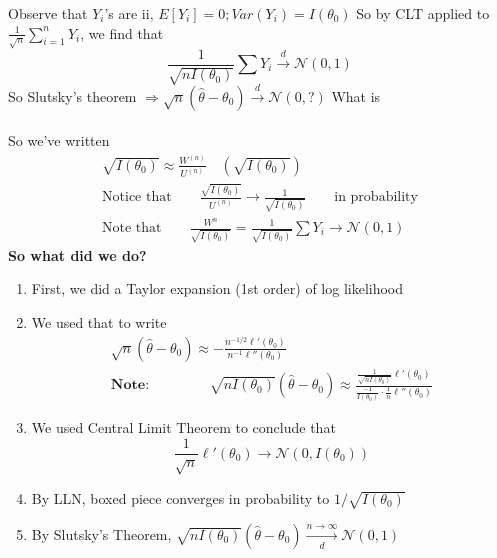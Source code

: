 Observe that $Y_i$'s are ii, $E[Y_i] = 0; Var(Y_i) = I(\theta_0)$ So by CLT applied to $\frac{1}{\sqrt{n}} \sum\limits_{i=1}^n Y_i$, we find that
\begin{equation*}
	\frac{1}{\sqrt{n I(\theta_0)}} \sum Y_i \xrightarrow{d} \mathcal{N}(0,1)
\end{equation*}
So Slutsky's theorem $\Rightarrow \sqrt{n} (\hat{\theta} - \theta_0) \xrightarrow{d} \mathcal{N} (0, ?)$ \qquad What is \\\\
So we've written 
\begin{gather*}
	[\sqrt{n} (\hat{\theta} - \theta_0) ] \sqrt{I(\theta_0)} \approx \frac{W^{(n)}}{U^{(n)}} \quad (\sqrt{I(\theta_0)})\\
	\text{Notice that} \qquad \frac{\sqrt{I(\theta_0)}}{U^{(n)}} \rightarrow \frac{1}{\sqrt{I(\theta_0)}} \qquad \text{in probability}\\
	\text{Note that} \qquad \frac{W^n}{\sqrt{I(\theta_0)}} = \frac{1}{\sqrt{I(\theta_0)}} \sum Y_i \longrightarrow \mathcal{N}(0, 1)
\end{gather*}
\textbf{So what did we do?}
\begin{enumerate}
	\item First, we did a Taylor expansion (1st order) of log likelihood
	\item We used that to write 
	\begin{gather*}
		\sqrt{n}(\hat{\theta} - \theta_0) \approx -\frac{n^{-1/2}\ell ' (\theta_0)}{n^{-1} \ell '' (\theta_0)}\\
		\textbf{Note: } \qquad \qquad \sqrt{n I(\theta_0)} (\hat{\theta} - \theta_0) \approx \frac{\frac{1}{\sqrt{n I(\theta_0)}} \ell ' (\theta_0)}{\boxed{\frac{-1}{I(\theta_0)} \cdot \frac{1}{n} \ell '' (\theta_0)}}
	\end{gather*}
	\item We used Central Limit Theorem to conclude that
	\begin{equation*}
		\frac{1}{\sqrt{n}} \ell ' (\theta_0) \rightarrow \mathcal{N} (0, I(\theta_0))
	\end{equation*}
	\item By LLN, boxed piece converges in probability to $1/ \sqrt{I(\theta_0)}$
	\item By Slutsky's Theorem, $\sqrt{n I(\theta_0)} (\hat{\theta} - \theta_0) \xrightarrow[d]{n \rightarrow \infty} \mathcal{N} (0,1) $
\end{enumerate}

